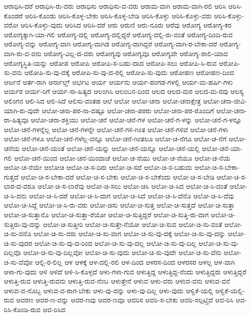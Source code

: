 {ಆರಾಧಿಸಿ-ದರೆ
ಆರಾಧಿಸಿ-ರು-ವರು
ಆರಾಧಿಸು
ಆರಾಧಿಸು-ವ-ವರು
ಆರಾಮ-ವಾಗಿ
ಆರಾಮ-ವಾಗಿ-ರಲಿ
ಆರಿಸಿ
ಆರಿಸಿ-ಕೊಂಡರೆ
ಆರಿಸಿ-ಕೊಂಡು
ಆರಿಸಿ-ಕೊಳ್ಳ-ಬೇಕು
ಆರಿಸಿ-ಕೊಳ್ಳ-ಬೇಡಿ
ಆರಿಸಿ-ಕೊಳ್ಳು
ಆರಿಸಿ-ಕೊಳ್ಳು-ವರು
ಆರಿಸಿ-ಕೊಳ್ಳು-ವರೋ
ಆರಿಸಿ-ಕೊಳ್ಳು-ವುದು
ಆರಿಸಿದ
ಆರಿಸಿ-ದರೆ
ಆರು
ಆರುಣಿ
ಆರು-ನೂರು
ಆರೆವು
ಆರೋಗ್ಯ
ಆರೋಗ್ಯ-ಕರ
ಆರೋಗ್ಯಕ್ಕಾಗಿ-ಯಾ-ಗಲಿ
ಆರೋಗ್ಯ-ದಲ್ಲಿ
ಆರೋಗ್ಯ-ದಲ್ಲಿದ್ದರೆ
ಆರೋಗ್ಯ-ದಲ್ಲಿ-ರು-ವಂತೆ
ಆರೋಗ್ಯ-ದಿಂದಿ-ರುವ
ಆರೋಗ್ಯ-ವನ್ನು
ಆರೋಗ್ಯ-ವಾಗಿ
ಆರೋಗ್ಯ-ವಾಗಿಡ
ಆರೋಗ್ಯ-ವಾಗಿದ್ದರೆ
ಆರೋಗ್ಯ-ವಾಗಿ-ರ-ಬೇಕಾ-ದರೆ
ಆರೋಗ್ಯ-ವಾಗಿ-ರು-ವ-ವನು
ಆರೋಗ್ಯ-ವಿಲ್ಲ-ದ-ವರು
ಆರೋಗ್ಯವು
ಆರೋಗ್ಯವೂ
ಆರೋಗ್ಯವೇ
ಆರೋಗ್ಯ-ಶಾಲಿ-ಯಾದ
ಆರೋಗ್ಯಸ್ಥಿತಿ-ಯನ್ನು
ಆರೋಪ
ಆರೋಪಿ
ಆರೋಪಿ-ಸ-ಬಹು-ದಾದ
ಆರೋಪಿ-ಸಲು
ಆರೋಪಿ-ಸಿ-ರುವ
ಆರೋಪಿ-ಸು-ವನು
ಆರೋಪಿ-ಸು-ವು-ದಕ್ಕೆ
ಆರೋಪಿ-ಸು-ವು-ದ-ರಲ್ಲಿ
ಆರೋಪಿ-ಸು-ವುದು
ಆರೋಹಣ
ಆರೋಹಣ-ದಿಂದ
ಆರ್ಜನೆ
ಆರ್ತ-ರಾಗಿ
ಆರ್ನಾಲ್ಡ್
ಆರ್ಭಟ
ಆರ್ಯ
ಆರ್ಯನು
ಆರ್ಯ-ಪಂಗಡ-ಗಳಲ್ಲಿ
ಆರ್ಯ-ಮ-ಹರ್ಷಿ-ಗಳು
ಆರ್ಯರ
ಆರ್ಯ-ರಿಗೆ
ಆರ್ಯ-ಸಾ-ಹಿತ್ಯದ
ಆಲಂಗಿಸಿ
ಆಲಂಬನ-ದಿಂದ
ಆಲದ
ಆಲದ-ಮರ
ಆಲದ-ಮ-ರವು
ಆಲಸ್ಯ
ಆಲಿಂಗನ
ಆಲಿ-ಸಿದ
ಆಲಿ-ಸಿದೆ
ಆಲಿಸು-ವಂತಹ
ಆಲೆ
ಆಲೋ
ಆಲೋ-ಚನಾ
ಆಲೋ-ಚನಾಕ್ಷೇತ್ರ
ಆಲೋ-ಚನಾ-ಜೀವಿ-ಯಾಗಿ-ರು-ವುದೇ
ಆಲೋ-ಚನಾ-ಪರ-ನಾ-ದಷ್ಟೂ
ಆಲೋ-ಚನಾ-ಪರರು
ಆಲೋ-ಚನಾ-ಪರ-ರೊಂದಿಗೆ
ಆಲೋ-ಚನಾ-ರಾ-ಹಿತ್ಯವೂ
ಆಲೋ-ಚನಾ-ಶಕ್ತಿಯು
ಆಲೋ-ಚನೆ
ಆಲೋ-ಚನೆ-ಗಳ
ಆಲೋ-ಚನೆ-ಗ-ಳನ್ನು
ಆಲೋ-ಚನೆ-ಗ-ಳನ್ನೂ
ಆಲೋ-ಚನೆ-ಗಳನ್ನೆಲ್ಲ
ಆಲೋ-ಚನೆ-ಗಳನ್ನೇ
ಆಲೋ-ಚನೆ-ಗಳಿ-ಗಿಂತ
ಆಲೋ-ಚನೆ-ಗಳಿವೆ
ಆಲೋ-ಚನೆ-ಗಳು
ಆಲೋ-ಚನೆ-ಗಳೂ
ಆಲೋ-ಚನೆ-ಗಳೆಲ್ಲ-ವನ್ನೂ
ಆಲೋ-ಚನೆ-ಗಿಂತಲೂ
ಆಲೋ-ಚ-ನೆಗೂ
ಆಲೋ-ಚ-ನೆಗೆ
ಆಲೋ-ಚನೆಯ
ಆಲೋ-ಚನೆ-ಯಂತೆ
ಆಲೋ-ಚನೆ-ಯನ್ನು
ಆಲೋ-ಚನೆ-ಯನ್ನೂ
ಆಲೋ-ಚನೆ-ಯಲ್ಲಿ
ಆಲೋ-ಚನೆ-ಯಾ-ಗಲಿ
ಆಲೋ-ಚನೆ-ಯಿಂದ
ಆಲೋ-ಚನೆ-ಯಿಂದಾಚೆ
ಆಲೋ-ಚ-ನೆಯು
ಆಲೋ-ಚ-ನೆಯೂ
ಆಲೋ-ಚ-ನೆಯೆ
ಆಲೋ-ಚ-ನೆಯೇ
ಆಲೋಚಿ
ಆಲೋ-ಚಿ-ಸ-ದಿರು
ಆಲೋ-ಚಿ-ಸದೆ
ಆಲೋ-ಚಿ-ಸ-ಬಹುದು
ಆಲೋ-ಚಿ-ಸ-ಬೇಕಾ-ಗುತ್ತದೆ
ಆಲೋ-ಚಿ-ಸ-ಬೇಕಾ-ದರೆ
ಆಲೋ-ಚಿ-ಸ-ಬೇಕು
ಆಲೋ-ಚಿ-ಸ-ಬೇಕೆಂದು
ಆಲೋ-ಚಿ-ಸ-ಬೇಡಿ
ಆಲೋ-ಚಿ-ಸ-ಲಾರ-ದ-ವರೂ
ಆಲೋ-ಚಿ-ಸ-ಲಾರೆವು
ಆಲೋ-ಚಿ-ಸಲು
ಆಲೋ-ಚಿಸಿ
ಆಲೋ-ಚಿ-ಸಿದ
ಆಲೋ-ಚಿ-ಸಿ-ದಂತೆ
ಆಲೋ-ಚಿ-ಸಿ-ದನು
ಆಲೋ-ಚಿ-ಸಿ-ದರೆ
ಆಲೋ-ಚಿ-ಸಿ-ದಾಗ
ಆಲೋ-ಚಿ-ಸಿದೆ
ಆಲೋ-ಚಿ-ಸಿ-ದೆನೊ
ಆಲೋ-ಚಿ-ಸಿ-ದೆವು
ಆಲೋ-ಚಿ-ಸಿದ್ದೆ
ಆಲೋ-ಚಿ-ಸಿ-ರು-ವರು
ಆಲೋ-ಚಿಸು
ಆಲೋ-ಚಿ-ಸುತ್ತ
ಆಲೋ-ಚಿ-ಸುತ್ತದೆ
ಆಲೋ-ಚಿ-ಸುತ್ತಾ
ಆಲೋ-ಚಿ-ಸುತ್ತಾನೊ
ಆಲೋ-ಚಿ-ಸುತ್ತಾ-ರೆಯೋ
ಆಲೋ-ಚಿ-ಸುತ್ತಿದ್ದರೆ
ಆಲೋ-ಚಿ-ಸುತ್ತಿ-ರು-ವಾಗ
ಆಲೋ-ಚಿ-ಸುತ್ತಿರು-ವು-ದನ್ನು
ಆಲೋ-ಚಿ-ಸುತ್ತೀರಿ
ಆಲೋ-ಚಿ-ಸುತ್ತೇ-ನೆಯೋ
ಆಲೋ-ಚಿ-ಸುವ
ಆಲೋ-ಚಿ-ಸು-ವಂತೆ
ಆಲೋ-ಚಿ-ಸು-ವನೊ
ಆಲೋ-ಚಿ-ಸು-ವರು
ಆಲೋ-ಚಿ-ಸು-ವಾಗ
ಆಲೋ-ಚಿ-ಸು-ವು-ದಕ್ಕೆ
ಆಲೋ-ಚಿ-ಸು-ವು-ದನ್ನು
ಆಲೋ-ಚಿ-ಸು-ವುದರ
ಆಲೋ-ಚಿ-ಸು-ವು-ದ-ರಿಂದ
ಆಲೋ-ಚಿ-ಸು-ವು-ದಲ್ಲ
ಆಲೋ-ಚಿ-ಸು-ವು-ದಿಲ್ಲ
ಆಲೋ-ಚಿ-ಸು-ವು-ದಿಲ್ಲವೊ
ಆಲೋ-ಚಿ-ಸು-ವು-ದಿಲ್ಲವೋ
ಆಲೋ-ಚಿ-ಸು-ವುದು
ಆಲೋ-ಚಿ-ಸು-ವುದೇ
ಆಲೋ-ಚಿ-ಸು-ವೆನು
ಆಲೋ-ಚಿ-ಸು-ವೆವೋ
ಆಲ್ಲಿ-ರ-ಲಿಲ್ಲ
ಆಳ
ಆಳಕ್ಕೆ
ಆಳ-ದಲ್ಲಿ-ರಲಿ
ಆಳ-ದಿಂದ
ಆಳರಸ-ದಿಂದ
ಆಳರಸರ
ಆಳಲ್ಲ
ಆಳ-ವಾಗಿ
ಆಳಾ-ಗು-ವುದು
ಆಳಿ
ಆಳಿದೆ
ಆಳಿ-ಸಿ-ಕೊಳ್ಳದೆ
ಆಳು-ಗಳಾ-ಗುವ
ಆಳುತ್ತಿದ್ದ
ಆಳುತ್ತಿದ್ದ-ನೆಂದು
ಆಳುತ್ತಿದ್ದರು
ಆಳುತ್ತಿದ್ದರೆ
ಆಳುತ್ತಿ-ರುವ
ಆಳುತ್ತಿ-ರುವನು
ಆಳುತ್ತಿ-ರುವ-ನೆಂಬ
ಆಳುತ್ತೇನೆ
ಆಳುವ
ಆಳು-ವರು
ಆಳುವ-ವನು
ಆಳುವ-ವನೆ
ಆಳುವ-ವ-ನೊಬ್ಬ
ಆಳುವ-ವ-ರಾಗ-ಬೇಕು
ಆಳು-ವು-ದನ್ನು
ಆಳು-ವು-ದಿಲ್ಲ
ಆಳು-ವುದು
ಆಳ್ವಿಕೆ-ಯಲ್ಲಿ
ಆಳ್ವಿಕೆ-ಯಲ್ಲಿ-ರುವ
ಆವರಣ
ಆವರ-ಣ-ವನ್ನು
ಆವರ-ಣವು
ಆವರ-ಣವೂ
ಆವರಿಸ
ಆವರಿ-ಸ-ಬೇಕು
ಆವರಿ-ಸಲ್ಪಟ್ಚಿದೆ
ಆವ-ರಿಸಿ
ಆವ-ರಿಸಿ-ಕೊಂಡಿ-ರುವ
ಆವ-ರಿಸಿದ
}

